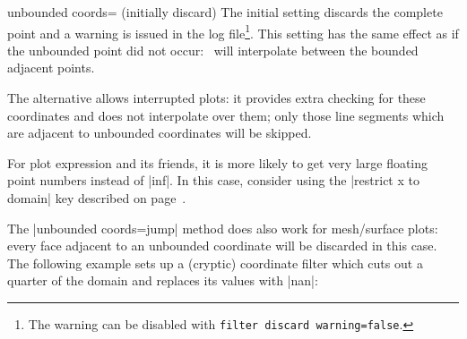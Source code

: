 {\begin{pgfplotskey}{unbounded coords= (initially discard)}
	The initial setting  discards the complete point and a warning is issued in the log file\footnote{The warning can be disabled with \texttt{filter discard warning=false}.}. This setting has the same effect as if the unbounded point did not occur: \PGFPlots\ will interpolate between the bounded adjacent points.

	The alternative  allows interrupted plots: it provides extra checking for these coordinates and does not interpolate over them; only those line segments which are adjacent to unbounded coordinates will be skipped. 
\begin{codeexample}[]
\end{codeexample}

	For plot expression and its friends, it is more likely to get very large floating point numbers instead of |inf|. In this case, consider using the |restrict x to domain| key described on page~\pageref{key:restrict:x:to:domain}.

	The |unbounded coords=jump| method does also work for mesh/surface plots: every face adjacent to an unbounded coordinate will be discarded in this case. The following example sets up a (cryptic) coordinate filter which cuts out a quarter of the domain and replaces its values with |nan|:

\pgfplotsexpensiveexample
\begin{codeexample}[]
\end{codeexample}
\end{pgfplotskey}

}
